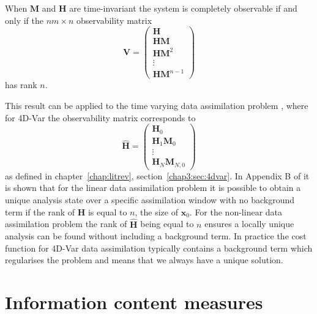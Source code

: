 \begin{theorem} \label{chap5:thm:observable}
When $\textbf{M}$ and $\textbf{H}$ are time-invariant the system is completely observable if and only if the $nm \times n$ observability matrix
\begin{equation}
\mathbf{V}=
\begin{pmatrix}
\mathbf{H} \\
\mathbf{H}\mathbf{M}\\
\mathbf{H}\mathbf{M}^{2}\\
\vdots \\
\mathbf{H}\mathbf{M}^{n-1}
\end{pmatrix}
\end{equation}
has rank $n$.
\end{theorem}

This result can be applied to the time varying data assimilation problem \citep{johnson2005singular}, where for 4D-Var the observability matrix corresponds to
\begin{equation}
\hat{\mathbf{H}}=
\begin{pmatrix}
\mathbf{H}_0 \\
\mathbf{H}_1\mathbf{M}_0\\
\vdots \\
\mathbf{H}_N\mathbf{M}_{N,0}
\end{pmatrix} \label{chap5:eqn: hmat}
\end{equation}
as defined in chapter~\ref{chap:litrev}, section~\ref{chap3:sec:4dvar}. In Appendix B of \citet{zou1992incomplete} it is shown that for the linear data assimilation problem it is possible to obtain a unique analysis state over a specific assimilation window with no background term if the rank of $\hat{\textbf{H}}$ is equal to $n$, the size of $\textbf{x}_0$. For the non-linear data assimilation problem the rank of $\hat{\textbf{H}}$ being equal to $n$ ensures a locally unique analysis can be found without including a background term. In practice the cost function for 4D-Var data assimilation typically contains a background term which regularises the problem and means that we always have a unique solution.

\section{Information content measures} \label{chap5:sec:IC}%

